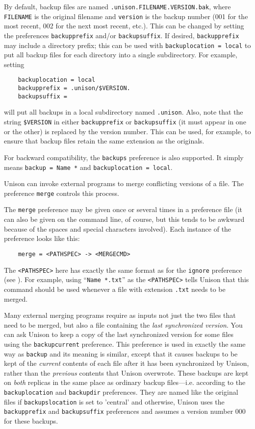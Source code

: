 \documentclass{article}
\begin{document}
By default, backup files are named \verb|.unison.FILENAME.VERSION.bak|,
where \verb|FILENAME| is the original filename and \verb|version| is the
backup number (001 for the most recent, 002 for the next most recent,
etc.).  This can be changed by setting the preferences \verb|backupprefix|
and/or \verb|backupsuffix|.  If desired, \verb|backupprefix| may include a
directory prefix; this can be used with \verb|backuplocation = local| to put all
backup files for each directory into a single subdirectory.  For example, setting
\begin{verbatim}
    backuplocation = local
    backupprefix = .unison/$VERSION.
    backupsuffix = 
\end{verbatim}
will put all backups in a local subdirectory named \verb|.unison|.  Also,
note that the string \verb|$VERSION| in either \verb|backupprefix| or
\verb|backupsuffix| (it must appear in one or the other) is replaced by
the version number.  This can be used, for example, to ensure that backup
files retain the same extension as the originals.

For backward compatibility, the \verb|backups| preference is also supported.
%
It simply means \verb|backup = Name *| and \verb|backuplocation = local|.



Unison can invoke external programs to merge conflicting versions of a file.
The preference \verb|merge| controls this process.  

The \verb|merge| preference may be given once or several times in a
preference file (it can also be given on the command line, of course, but
this tends to be awkward because of the spaces and special characters
involved).  Each instance of the preference looks like this:
\begin{verbatim}
    merge = <PATHSPEC> -> <MERGECMD>
\end{verbatim}
The \verb|<PATHSPEC>| here has exactly the same format as for the
\verb|ignore| preference (see ).  For example,
using ``\verb|Name *.txt|'' as the \verb|<PATHSPEC>| tells Unison that this
command should be used whenever a file with extension \verb|.txt| needs to
be merged.  

Many external merging programs require as inputs not just the two files that
need to be merged, but also a file containing the {\em last synchronized
  version}.  You can ask Unison to keep a copy of the last synchronized
version for some files using the \verb|backupcurrent| preference. This
preference is used in exactly the same way as \verb|backup| and its meaning
is similar, except that it causes backups to be kept of the {\em current}
contents of each file after it has been synchronized by Unison, rather than
the {\em previous} contents that Unison overwrote.  These backups are kept
on {\em both} replicas in the same place as ordinary backup files---i.e.
according to the \verb|backuplocation| and \verb|backupdir| preferences.
They are named like the original files if \verb|backupslocation| is set to
'central' and otherwise, Unison uses the \verb|backupprefix| and
\verb|backupsuffix| preferences and assumes a version number 000 for these
backups.
\end{document}
